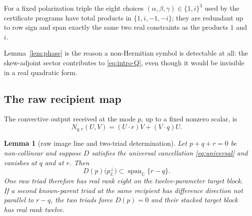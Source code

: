 \documentclass[11pt]{article}
\newtheorem{lemma}[theorem]{Lemma}
\theoremstyle{definition}
\theoremstyle{remark}
\theoremstyle{plain}
\DeclareMathOperator{\spn}{span}
\newcommand{\C}{\mathbb{C}}
\begin{document}
For a fixed polarization triple the eight choices
$(\alpha,\beta,\gamma)\in\{1,i\}^{3}$ used by the certificate programs have
total products in $\{1,i,-1,-i\}$; they are redundant up to row sign and span
exactly the same two real constraints as the products $1$ and $i$.

Lemma~\ref{lem:phase} is the reason a non-Hermitian symbol is detectable at
all: the skew-adjoint sector contributes to \eqref{eq:intro-Q}, even though it
would be invisible in a real quadratic form.

\subsection{The raw recipient map}
\label{subsec:raw}

The convective output received at the mode $p$, up to a fixed nonzero scalar,
is
\begin{equation}
\label{eq:rawN}
N_{q,r}(U,V)=(U\cdot r)V+(V\cdot q)U .
\end{equation}

\begin{lemma}[raw image line and two-triad determination]
\label{lem:rawline}
Let $p+q+r=0$ be non-collinear and suppose $D$ satisfies the universal
cancellation \eqref{eq:universal} and vanishes at $q$ and at $r$. Then
\begin{equation}
\label{eq:imageline}
D(p)\bigl(p_{\C}^{\perp}\bigr)\subset\spn_{\C}\{r-q\} .
\end{equation}
One raw triad therefore has real rank eight on the twelve-parameter target
block. If a second known-parent triad at the same recipient has difference
direction not parallel to $r-q$, the two triads force $D(p)=0$ and their
stacked target block has real rank twelve.
\end{lemma}
\end{document}
